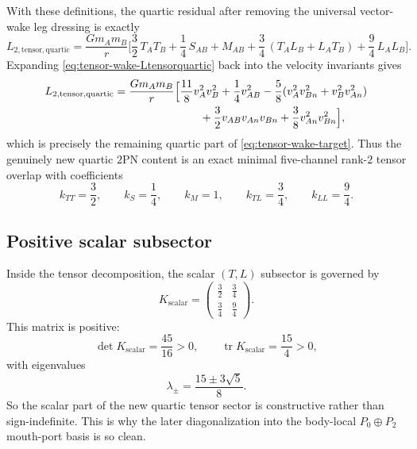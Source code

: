 \documentclass[11pt]{article}
\newcommand{\TwoPN}{\mathrm{2PN}}
\begin{document}
With these definitions, the quartic residual after removing the universal vector-wake
leg dressing is exactly
\begin{equation}
L_{2,\mathrm{tensor,quartic}}
=
\frac{Gm_A m_B}{r}
\Big[
\frac32\,T_A T_B
+\frac14\,S_{AB}
+M_{AB}
+\frac34\,(T_A L_B+L_A T_B)
+\frac94\,L_A L_B
\Big].
\label{eq:tensor-wake-Ltensorquartic}
\end{equation}
Expanding \cref{eq:tensor-wake-Ltensorquartic} back into the velocity invariants gives
\begin{align}
L_{2,\mathrm{tensor,quartic}}
={}&
\frac{Gm_A m_B}{r}
\Big[
\frac{11}{8}v_A^2v_B^2
+\frac14 v_{AB}^2
-\frac58(v_A^2v_{Bn}^2+v_B^2v_{An}^2)
\notag\\
&\hspace{6.4em}
+\frac32 v_{AB}v_{An}v_{Bn}
+\frac38 v_{An}^2v_{Bn}^2
\Big],
\label{eq:tensor-wake-quartic-expanded}
\end{align}
which is precisely the remaining quartic part of \cref{eq:tensor-wake-target}.
Thus the genuinely new quartic \(\TwoPN\) content is an exact minimal five-channel
rank-\(2\) tensor overlap with coefficients
\begin{equation}
k_{TT}=\frac32,
\qquad
k_S=\frac14,
\qquad
k_M=1,
\qquad
k_{TL}=\frac34,
\qquad
k_{LL}=\frac94.
\label{eq:tensor-wake-kcoeffs}
\end{equation}

\subsection{Positive scalar subsector}
\label{app:tensor-wake-positive}

Inside the tensor decomposition, the scalar \((T,L)\) subsector is governed by
\begin{equation}
K_{\mathrm{scalar}}
=
\begin{pmatrix}
\frac32 & \frac34\\[4pt]
\frac34 & \frac94
\end{pmatrix}.
\label{eq:tensor-wake-Kscalar}
\end{equation}
This matrix is positive:
\begin{equation}
\det K_{\mathrm{scalar}}=\frac{45}{16}>0,
\qquad
\operatorname{tr}K_{\mathrm{scalar}}=\frac{15}{4}>0,
\label{eq:tensor-wake-Kscalar-pos}
\end{equation}
with eigenvalues
\begin{equation}
\lambda_{\pm}=\frac{15\pm 3\sqrt5}{8}.
\label{eq:tensor-wake-Kscalar-eigs}
\end{equation}
So the scalar part of the new quartic tensor sector is constructive rather than
sign-indefinite.  This is why the later diagonalization into the body-local
\(P_0\oplus P_2\) mouth-port basis is so clean.
\end{document}
